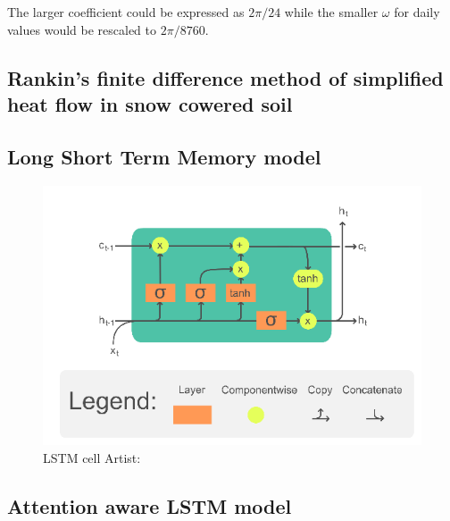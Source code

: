 The larger coefficient could be expressed as $2\pi/24$ while the smaller $\omega$ for daily values would be rescaled to $2\pi/8760$.

\subsection[Rankin algorithm]{Rankin's finite difference method of simplified heat flow in snow cowered soil}\cite{rankinen_simple_2004}


\subsection{Long Short Term Memory model}

\begin{figure}[ht]
	\centering
	\includegraphics[width=0.7\linewidth]{figures/LSTM_Cell}
	\caption{LSTM cell  Artist: \textcite{chevalier_english_2018}}
	\label{fig:lstmcell}
\end{figure}

\subsection[ILSTM]{Attention aware LSTM model}

